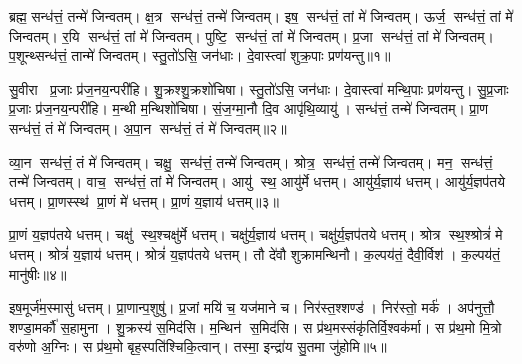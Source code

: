 



\setcounter{anuvakam}{0}
ब्रह्म॒ सन्ध॑त्तं॒ तन्मे॑ जिन्वतम्। क्ष॒त्र सन्ध॑त्तं॒ तन्मे॑ जिन्वतम्। इष॒ सन्ध॑त्तं॒ तां मे॑ जिन्वतम्। ऊर्ज॒ सन्ध॑त्तं॒ तां मे॑ जिन्वतम्। र॒यि सन्ध॑त्तं॒ तां मे॑ जिन्वतम्। पुष्टि॒ सन्ध॑त्तं॒ तां मे॑ जिन्वतम्। प्र॒जा सन्ध॑त्तं॒ तां मे॑ जिन्वतम्। प॒शून्थ्सन्ध॑त्तं॒ तान्मे॑ जिन्वतम्। स्तु॒तो॑ऽसि॒ जन॑धाः। दे॒वास्त्वा॑ शुक्र॒पाः प्रण॑यन्तु॥१॥

सु॒वीरा प्र॒जाः प्र॑ज॒नय॒न्परी॑हि। शु॒क्रश्शु॒क्रशो॑चिषा। स्तु॒तो॑ऽसि॒ जन॑धाः। दे॒वास्त्वा॑ मन्थि॒पाः प्रण॑यन्तु। सु॒प्र॒जाः प्र॒जाः प्र॑ज॒नय॒न्परी॑हि। म॒न्थी म॒न्थिशो॑चिषा। सं॒ज॒ग्मा॒नौ दि॒व आपृ॑थि॒व्यायु॑। सन्ध॑त्तं॒ तन्मे॑ जिन्वतम्। प्रा॒ण सन्ध॑त्तं॒ तं मे॑ जिन्वतम्। अ॒पा॒न सन्ध॑त्तं॒ तं मे॑ जिन्वतम्॥२॥

व्या॒न सन्ध॑त्तं॒ तं मे॑ जिन्वतम्। चक्षु॒ सन्ध॑त्तं॒ तन्मे॑ जिन्वतम्। श्रोत्र॒ सन्ध॑त्तं॒ तन्मे॑ जिन्वतम्। मन॒ सन्ध॑त्तं॒ तन्मे॑ जिन्वतम्। वाच॒ सन्ध॑त्तं॒ तां मे॑ जिन्वतम्। आयु॑ स्थ॒ आयु॑र्मे धत्तम्। आयु॑र्य॒ज्ञाय॑ धत्तम्। आयु॑र्य॒ज्ञप॑तये धत्तम्। प्रा॒णस्स्थ॑ प्रा॒णं मे॑ धत्तम्। प्रा॒णं य॒ज्ञाय॑ धत्तम्॥३॥

प्रा॒णं य॒ज्ञप॑तये धत्तम्। चक्षु॑ स्थ॒श्चक्षु॑र्मे धत्तम्। चक्षु॑र्य॒ज्ञाय॑ धत्तम्। चक्षु॑र्य॒ज्ञप॑तये धत्तम्। श्रोत्र स्थ॒श्श्रोत्रं॑ मे धत्तम्। श्रोत्रं॑ य॒ज्ञाय॑ धत्तम्। श्रोत्रं॑ य॒ज्ञप॑तये धत्तम्। तौ दे॑वौ शुक्रामन्थिनौ। क॒ल्पय॑तं॒ दैवी॒र्विश॑। क॒ल्पय॑तं॒ मानु॑षीः॥४॥

इष॒मूर्ज॑म॒स्मासु॑ धत्तम्। प्रा॒णान्प॒शुषु॑। प्र॒जां मयि॑ च॒ यज॑माने च। निर॑स्त॒श्शण्ड॑। निर॑स्तो॒ मर्क॑। अप॑नुत्तौ॒ शण्डा॒मर्कौ॑ स॒हामुना। शु॒क्रस्य॑ स॒मिद॑सि। म॒न्थिन॑ स॒मिद॑सि। स प्र॑थ॒मस्संकृ॑तिर्वि॒श्वक॑र्मा। स प्र॑थ॒मो मि॒त्रो वरु॑णो अ॒ग्निः। स प्र॑थ॒मो बृह॒स्पति॑श्चिकि॒त्वान्। तस्मा॒ इन्द्रा॑य सु॒तमा जु॑होमि॥५॥\anuvakamend[न॒य॒न्त्व॒पा॒न सन्ध॑त्तं॒ तं मे॑ जिन्वतं प्रा॒णं य॒ज्ञाय॑ धत्तं॒ मानु॑षीर॒ग्निर्द्वे च॑॥ (ब्रह्म॑ क्ष॒त्रं तदिष॒मूर्ज र॒यिं पुष्टिं॑ प्र॒जां तां प॒शून्तान्थ्सन्ध॑त्तं॒ तत्प्रा॒णम॑पा॒नं व्या॒नं तं चक्षु॒श्श्रोत्रं॒ मन॒स्तद्वाचं॒ ताम्। इ॒षादि॒पञ्च॑के॒ वाचं॒ तां मे॑ प॒शून्थ्सन्ध॑त्तं॒ तान्मे प्रा॒णादि॒त्रित॑ये॒ तं मे॒ऽन्यत्र॒ तन्मे)]

